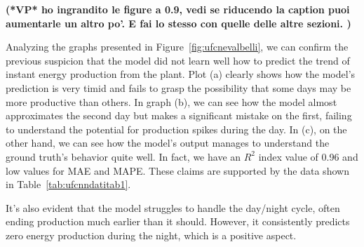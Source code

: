 {\bf (*VP* ho ingrandito le figure a 0.9, vedi se riducendo la caption puoi aumentarle un altro po'. E fai lo stesso con quelle delle altre sezioni. )}

Analyzing the graphs presented in Figure~\ref{fig:ufcnevalbelli},
we can confirm the previous suspicion that the model did not learn well how
to predict the trend of instant energy production from the plant.
Plot (a) clearly shows how the model's prediction is very timid
and fails to grasp the possibility that some days may be more productive
than others.
In graph (b), we can see how the model almost approximates the second
day but makes a significant mistake on the first,
failing to understand the potential for production spikes during the day. In (c), on the other hand, we can see
how the model's output manages to understand the
ground truth's behavior quite well. In fact,
we have an $R^2$ index value of 0.96 and low values for MAE and MAPE. These claims are supported by the data shown in Table~\ref{tab:ufcnndatitab1}.

It's also evident that the model struggles to handle the
day/night cycle, often ending production much earlier than it should.
However, it consistently predicts zero energy production
during the night, which is a positive aspect.


